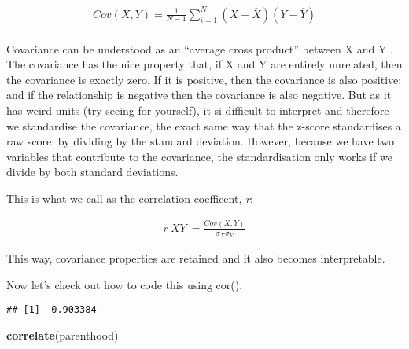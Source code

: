\documentclass[
]{article}
\newenvironment{Shaded}{\begin{snugshade}}{\end{snugshade}}
\newcommand{\AttributeTok}[1]{\textcolor[rgb]{0.13,0.29,0.53}{#1}}
\newcommand{\FunctionTok}[1]{\textcolor[rgb]{0.13,0.29,0.53}{\textbf{#1}}}
\newcommand{\NormalTok}[1]{#1}
\newcommand{\SpecialCharTok}[1]{\textcolor[rgb]{0.81,0.36,0.00}{\textbf{#1}}}
\begin{document}
\begin{align*}
 
 Cov (X, Y) = \frac{1}{N-1}\sum_{i=1}^{N} (X- \overline{X} ) (Y- \overline{Y} )  \\
 
 \end{align*}

Covariance can be understood as an ``average cross product'' between X
and Y . The covariance has the nice property that, if X and Y are
entirely unrelated, then the covariance is exactly zero. If it is
positive, then the covariance is also positive; and if the relationship
is negative then the covariance is also negative. But as it has weird
units (try seeing for yourself), it si difficult to interpret and
therefore we standardise the covariance, the exact same way that the
z-score standardises a raw score: by dividing by the standard deviation.
However, because we have two variables that contribute to the
covariance, the standardisation only works if we divide by both standard
deviations.

This is what we call as the correlation coefficent, \emph{r}:

\begin{align*}

 r~XY~ = \frac{Cov(X,Y)}{\sigma_{X} \sigma_{Y}}

\end{align*}

This way, covariance properties are retained and it also becomes
interpretable.

Now let's check out how to code this using cor().

\begin{Shaded}
\end{Shaded}

\begin{verbatim}
## [1] -0.903384
\end{verbatim}

\begin{Shaded}
\begin{Highlighting}[]
\FunctionTok{correlate}\NormalTok{(parenthood)}
\end{Highlighting}
\end{Shaded}
\end{document}
